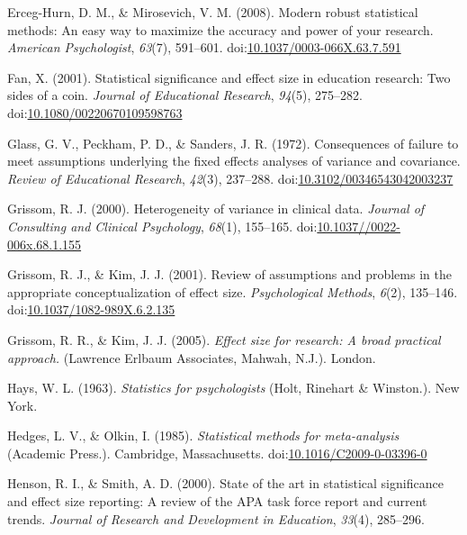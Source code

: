 \documentclass[man]{apa6}
\begin{document}
\leavevmode\hypertarget{ref-Erceg-Hurn_Mirosevich_2008}{}%
Erceg-Hurn, D. M., \& Mirosevich, V. M. (2008). Modern robust statistical methods: An easy way to maximize the accuracy and power of your research. \emph{American Psychologist}, \emph{63}(7), 591--601. doi:\href{https://doi.org/10.1037/0003-066X.63.7.591}{10.1037/0003-066X.63.7.591}

\leavevmode\hypertarget{ref-Fan_2001}{}%
Fan, X. (2001). Statistical significance and effect size in education research: Two sides of a coin. \emph{Journal of Educational Research}, \emph{94}(5), 275--282. doi:\href{https://doi.org/10.1080/00220670109598763}{10.1080/00220670109598763}

\leavevmode\hypertarget{ref-Glass_et_al_1972}{}%
Glass, G. V., Peckham, P. D., \& Sanders, J. R. (1972). Consequences of failure to meet assumptions underlying the fixed effects analyses of variance and covariance. \emph{Review of Educational Research}, \emph{42}(3), 237--288. doi:\href{https://doi.org/10.3102/00346543042003237}{10.3102/00346543042003237}

\leavevmode\hypertarget{ref-Grissom_2000}{}%
Grissom, R. J. (2000). Heterogeneity of variance in clinical data. \emph{Journal of Consulting and Clinical Psychology}, \emph{68}(1), 155--165. doi:\href{https://doi.org/10.1037//0022-006x.68.1.155}{10.1037//0022-006x.68.1.155}

\leavevmode\hypertarget{ref-Grissom_Kim_2001}{}%
Grissom, R. J., \& Kim, J. J. (2001). Review of assumptions and problems in the appropriate conceptualization of effect size. \emph{Psychological Methods}, \emph{6}(2), 135--146. doi:\href{https://doi.org/10.1037/1082-989X.6.2.135}{10.1037/1082-989X.6.2.135}

\leavevmode\hypertarget{ref-Grissom_and_kim_2005}{}%
Grissom, R. R., \& Kim, J. J. (2005). \emph{Effect size for research: A broad practical approach.} (Lawrence Erlbaum Associates, Mahwah, N.J.). London.

\leavevmode\hypertarget{ref-Hays_1963}{}%
Hays, W. L. (1963). \emph{Statistics for psychologists} (Holt, Rinehart \& Winston.). New York.

\leavevmode\hypertarget{ref-Hedges_Olkin_1985}{}%
Hedges, L. V., \& Olkin, I. (1985). \emph{Statistical methods for meta-analysis} (Academic Press.). Cambridge, Massachusetts. doi:\href{https://doi.org/10.1016/C2009-0-03396-0}{10.1016/C2009-0-03396-0}

\leavevmode\hypertarget{ref-Henson_Smith_2000}{}%
Henson, R. I., \& Smith, A. D. (2000). State of the art in statistical significance and effect size reporting: A review of the APA task force report and current trends. \emph{Journal of Research and Development in Education}, \emph{33}(4), 285--296.
\end{document}
